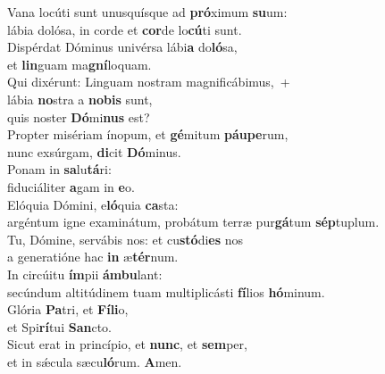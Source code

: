 \evenverse Vana locúti sunt unusquísque ad \textbf{pró}ximum \textbf{su}um:~\*\\
\evenverse lábia dolósa, in corde et \textbf{cor}de lo\textbf{cú}ti sunt.\\
\oddverse Dispérdat Dóminus univérsa lábi\textbf{a} do\textbf{ló}sa,~\*\\
\oddverse et \textbf{lin}guam ma\textbf{gní}loquam.\\
\evenverse Qui dixérunt: Linguam nostram magnificábimus,~+\\
\evenverse  lábia \textbf{no}stra a \textbf{no}\textbf{bis} sunt,~\*\\
\evenverse quis noster \textbf{Dó}mi\textbf{nus} est?\\
\oddverse Propter misériam ínopum, et \textbf{gé}mitum \textbf{páu}\textbf{pe}rum,~\*\\
\oddverse nunc exsúrgam, \textbf{di}cit \textbf{Dó}minus.\\
\evenverse Ponam in \textbf{sa}lu\textbf{tá}ri:~\*\\
\evenverse fiduciáliter \textbf{a}gam in \textbf{e}o.\\
\oddverse Elóquia Dómini, e\textbf{ló}quia \textbf{ca}sta:~\*\\
\oddverse argéntum igne examinátum, probátum terræ pur\textbf{gá}tum \textbf{sép}tuplum.\\
\evenverse Tu, Dómine, servábis nos: et cu\textbf{stó}di\textbf{es} nos~\*\\
\evenverse a generatióne hac \textbf{in} æ\textbf{tér}num.\\
\oddverse In circúitu \textbf{ím}pii \textbf{ám}\textbf{bu}lant:~\*\\
\oddverse secúndum altitúdinem tuam multiplicásti \textbf{fí}lios \textbf{hó}minum.\\
\evenverse Glória \textbf{Pa}tri, et \textbf{Fí}\textbf{li}o,~\*\\
\evenverse et Spi\textbf{rí}tui \textbf{San}cto.\\
\oddverse Sicut erat in princípio, et \textbf{nunc}, et \textbf{sem}per,~\*\\
\oddverse et in sǽcula sæcu\textbf{ló}rum. \textbf{A}men.\\
